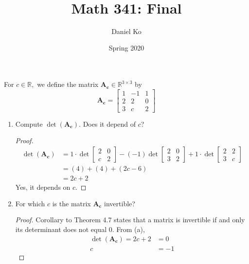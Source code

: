 \documentclass[11pt]{scrartcl}
\title{Math 341: Final}
\author{Daniel Ko}
\date{Spring 2020}
\begin{document}
\maketitle

\section{}
For $c \in \mathbb{R},$ we define the matrix $\mathbf{A}_{\mathbf{c}} \in \mathbb{R}^{3 \times 3}$ by
$$
	\mathbf{A}_{\mathbf{c}}=\begin{bmatrix}
		1 & -1 & 1 \\
		2 & 2  & 0 \\
		3 & c  & 2
	\end{bmatrix}
$$
\begin{enumerate}[label=\alph*.]
	\item {
	      Compute $\det(\mathbf{A}_{\mathbf{c}})$. Does it depend of $c$?
	      \begin{proof}
		      \begin{align*}
			      \det(\mathbf{A}_{\mathbf{c}}) & =1 \cdot \det \begin{bmatrix}2&0\\ c&2\end{bmatrix}-\left(-1\right)\det \begin{bmatrix}2&0\\ 3&2\end{bmatrix}+1\cdot \det \begin{bmatrix}2&2\\ 3&c\end{bmatrix} \\
			                                    & = (4) + (4) + (2c-6)                                                                                                        \\
			                                    & = 2c + 2
		      \end{align*}
		      Yes, it depends on $c$.
	      \end{proof}
	      }
	\item{
	      For which $c$ is the matrix $\mathbf{A}_{\mathbf{c}}$ invertible?
	      \begin{proof}
		      Corollary to Theorem 4.7 states that a matrix is invertible if and only its determinant does not equal 0.
		      From (a),
		      \begin{align*}
			      \det(\mathbf{A}_{\mathbf{c}}) = 2c + 2 & = 0  \\
			      c                                      & = -1

\end{align*}
\end{proof}}
\end{enumerate}
\end{document}
